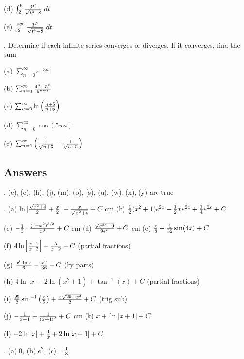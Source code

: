 \documentclass[12pt]{article}
\begin{document}
\noindent (d) $\int_2^6 {{3t^2}\over{\sqrt{t^3-8}}} \; dt$

\noindent (e) $\int_2^{\infty} {{3t^2}\over{\sqrt{t^3-8}}} \; dt$

\medskip
{}.  Determine if each infinite series converges or diverges.  If it 
converges, find the sum.

\noindent (a) $\sum_{n=0}^{\infty} e^{-3n}$

\smallskip
\noindent (b) $\sum_{n=1}^{\infty} {{4^n + 5^n}\over{9^{n-1}}}$

\smallskip
\noindent (c) $\sum_{n=0}^{\infty} \ln \left ( {{n+5}\over{n+6}} \right )$

\smallskip
\noindent (d) $\sum_{n=0}^{\infty} \cos (5 \pi n)$

\smallskip
\noindent (e) $\sum_{n=1}^{\infty} \left ( {{1}\over{\sqrt{n+3}}} - 
{{1}\over{\sqrt{n+5}}} \right )$

\subsection*{Answers}

.  (c), (e), (h), (j), (m), (o), (s), (u), (w), (x), (y) are true

. (a) $\ln | {{\sqrt{x^2+4}}\over{2}} + {{x}\over{2}} | - 
{{x}\over{\sqrt{x^2+4}}} + C$
 cm
(b) ${{1}\over{2}} (x^2+1) e^{2x} - {{1}\over{2}}
x e^{2x} + {{1}\over{4}} e^{2x} + C$

\smallskip
\noindent (c) $-{{1}\over{3}} \cdot {{(1-x^2)^{3/2}}\over{x^3}} + C$
 cm (d) ${{\sqrt{e^{2x}-9}}\over{9e^x}} + C$
 cm
(e) ${{x}\over{8}} - {{1}\over{32}} \sin(4x) + C$

\noindent (f)  $4 \ln \left | {{x-1}\over{x-2}} \right | - 
{{5}\over{x-2}} + 
C$ (partial fractions)

\smallskip
\noindent (g) ${{x^6 \ln x}\over{6}} - {{x^6}\over{36}} + C$ (by parts)

\smallskip
\noindent (h)  $4 \ln |x| - 2 \ln (x^2+1) + \tan^{-1} (x) + C$ (partial 
fractions)

\noindent (i) ${{25}\over{2}} \sin^{-1} \left ( {{x}\over{5}} \right ) + 
{{x \sqrt{25-x^2}}\over{2}} + C$ (trig sub)

\noindent (j)  $-{{1}\over{x+1}} + {{1}\over{(x+1)^2}} + C$  cm
(k)  $x + \ln|x+1| + C$ 

\noindent (l)  $-2 \ln|x| + {{1}\over{x}} + 2 \ln|x-1| + C$

. (a) 0, (b) $e^2$, (c) $-{{1}\over{8}}$ 
\end{document}
